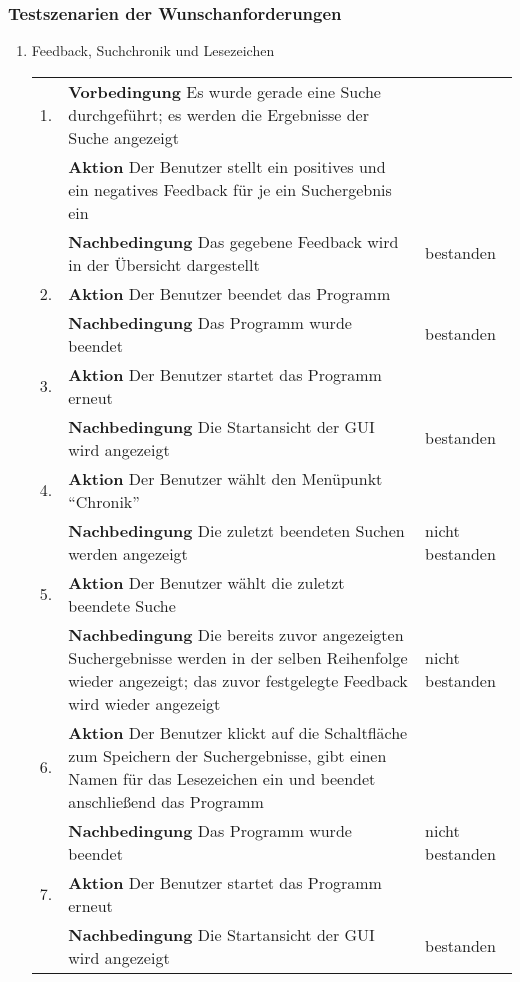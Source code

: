 \subsubsection{Testszenarien der Wunschanforderungen}
\begin{enumerate} [label=\bfseries /TSW \arabic*0/, leftmargin=*]
	\item Feedback, Suchchronik und Lesezeichen \newline \newline
	\begin{tabular}{@{}rp{4in}|l}
	1. & \textbf{Vorbedingung} Es wurde gerade eine Suche durchgeführt; es werden die Ergebnisse der Suche angezeigt & \\
	   & \textbf{Aktion} Der Benutzer stellt ein positives und ein negatives Feedback für je ein Suchergebnis ein & \\
	   & \textbf{Nachbedingung} Das gegebene Feedback wird in der Übersicht dargestellt & bestanden \\
	\hline
	2. & \textbf{Aktion} Der Benutzer beendet das Programm & \\
	   & \textbf{Nachbedingung} Das Programm wurde beendet & bestanden \\
	\hline
	3. & \textbf{Aktion} Der Benutzer startet das Programm erneut & \\
	   & \textbf{Nachbedingung} Die Startansicht der GUI wird angezeigt & bestanden \\
	\hline	
	4. & \textbf{Aktion} Der Benutzer wählt den Menüpunkt \enquote{Chronik} & \\
	   & \textbf{Nachbedingung} Die zuletzt beendeten Suchen werden angezeigt & nicht bestanden \\
	\hline
	5. & \textbf{Aktion} Der Benutzer wählt die zuletzt beendete Suche & \\
	   & \textbf{Nachbedingung} Die bereits zuvor angezeigten Suchergebnisse werden in der selben Reihenfolge wieder angezeigt; das zuvor festgelegte Feedback wird wieder angezeigt & nicht bestanden \\
	\hline
	6. & \textbf{Aktion} Der Benutzer klickt auf die Schaltfläche zum Speichern der Suchergebnisse, gibt einen Namen für das Lesezeichen ein und beendet anschließend das Programm & \\
	   & \textbf{Nachbedingung} Das Programm wurde beendet & nicht bestanden \\
	\hline
	7. & \textbf{Aktion} Der Benutzer startet das Programm erneut & \\
	   & \textbf{Nachbedingung} Die Startansicht der GUI wird angezeigt & bestanden \\

\end{tabular}
\end{enumerate}
